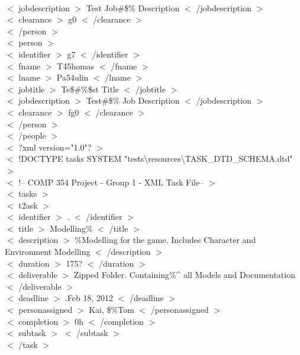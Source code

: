 \documentclass[12pt]{article}
\newcommand{\tab}{\hspace*{2em}}
\begin{document}
{\\ \tab\tab $<$ jobdescription $>$ Test Job\#\$\% Description $<$ /jobdescription $>$ 
\\ \tab\tab $<$ clearance $>$ g0 $<$ /clearance $>$ 
\\ \tab$<$ /person $>$ 
\\ \tab$<$ person $>$ 
\\ \tab\tab $<$ identifier $>$ g7 $<$ /identifier $>$ 
\\ \tab\tab $<$ fname $>$ T45homas $<$ /fname $>$ 
\\ \tab\tab $<$ lname $>$ Pa54ulin $<$ /lname $>$ 
\\ \tab\tab $<$ jobtitle $>$ Te\$\#\%\$st Title $<$ /jobtitle $>$ 
\\ \tab\tab $<$ jobdescription $>$ Test\#\$\% Job Description $<$ /jobdescription $>$ 
\\ \tab\tab $<$ clearance $>$ fg0 $<$ /clearance $>$ 
\\ \tab$<$ /person $>$ 
\\ $<$ /people $>$ 
\\ $<$ ?xml version="1.0"? $>$ 
\\ $<$ !DOCTYPE tasks SYSTEM "tests\textbackslash resources\textbackslash TASK\_DTD\_SCHEMA.dtd" $>$ 
\\ $<$ !-- COMP 354 Project - Group 1 - XML Task File-- $>$ 
\\ $<$ tasks $>$ 
\\ \tab$<$ t2ask $>$ 
\\ \tab    \tab $<$ identifier $>$ . $<$ /identifier $>$ 
\\ \tab    \tab $<$ title $>$ Modelling\% $<$ /title $>$ 
\\ \tab    \tab $<$ description $>$ \-\%Modelling for the game. Includes Character and Environment Modelling $<$ /description $>$ 
\\ \tab    \tab $<$ duration $>$ 175? $<$ /duration $>$ 
\\ \tab    \tab $<$ deliverable $>$ Zipped Folder. Containing\%\^{} all Models and Documentation $<$ /deliverable $>$ 
\\ \tab    \tab $<$ deadline $>$ .Feb 18, 2012 $<$ /deadline $>$ 
\\ \tab    \tab $<$ personassigned $>$ Kai, \$\%Tom $<$ /personassigned $>$ 
\\ \tab    \tab $<$ completion $>$ 0h $<$ /completion $>$ 
\\ \tab    \tab $<$ subtask $>$  $<$ /subtask $>$ 
\\ \tab$<$ /task $>$ 
}
\end{document}
